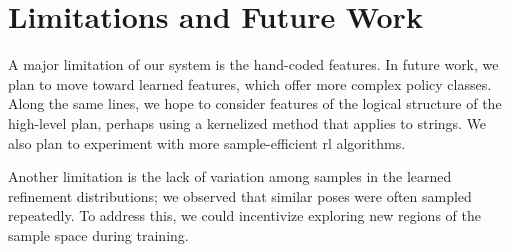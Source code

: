 \section{Limitations and Future Work}
A major limitation of our system is the hand-coded features. In future work, we
plan to move toward learned features, which offer more complex policy classes. Along the same
lines, we hope to consider features of the logical structure of the high-level plan, perhaps
using a kernelized method that applies to strings. We also plan to experiment with more
sample-efficient {\sc rl} algorithms.

Another limitation is the lack of variation among samples in the learned refinement distributions;
we observed that similar poses were often sampled repeatedly. To address
this, we could incentivize exploring new regions of the sample space during training.
